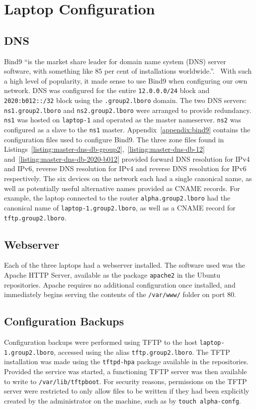 \chapter{Laptop Configuration}
\section{DNS}
    Bind9 ``is the market share leader for domain name system (DNS) server software,
    with something like 85 per cent of installations worldwide.''.~\cite{Mohan2010}
    With such a high level of popularity, it made sense to use Bind9 when configuring
    our own network. DNS was configured for the entire \texttt{12.0.0.0/24} block and \texttt
    {2020:b012::/32} block using the \texttt{.group2.lboro} domain. The two DNS
    servers: \texttt{ns1.group2.lboro} and \texttt{ns2.group2.lboro} were
    arranged to provide redundancy.
    \texttt{ns1} was hosted on \texttt{laptop-1} and operated as the master
    nameserver. \texttt{ns2} was configured as a slave to the \texttt{ns1}
    master. Appendix~\ref{appendix:bind9} contains the configuration files used
    to configure Bind9. The three zone files found in
    Listings~\ref {listing:master-dns-db-group2},~\ref{listing:master-dns-db-12} and~\ref {listing:master-dns-db-2020-b012} provided forward DNS
    resolution for IPv4 and IPv6, reverse DNS resolution for IPv4 and reverse
    DNS resolution for IPv6 respectively. The six devices on the network each
    had a single canonical name, as well as potentially useful alternative
    names provided as CNAME records. For example, the laptop connected to the
    router \texttt{alpha.group2.lboro} had the canonical name of
    \texttt{laptop-1.group2.lboro}, as well as a CNAME record for
    \texttt{tftp.group2.lboro}.
\section{Webserver}
    Each of the three laptops had a webserver installed. The software used was
    the Apache HTTP Server, available as the package \texttt{apache2} in the
    Ubuntu repositories. Apache requires no additional configuration once
    installed, and immediately begins serving the contents of the \texttt
    {/var/www/} folder on port 80.
\section{Configuration Backups}
    Configuration backups were performed using TFTP to the host \texttt
    {laptop-1.group2.lboro}, accessed using the alias \texttt
    {tftp.group2.lboro}. The TFTP installation was made using the \texttt
    {tftpd-hpa} package available in the repositories. Provided the service was
    started, a functioning TFTP server was then available to write to \texttt
    {/var/lib/tftpboot}. For security reasons, permissions on the TFTP server
    were restricted to only allow files to be written if they had been
    explicitly created by the administrator on the machine, such as by
    \texttt{touch alpha-confg}.
